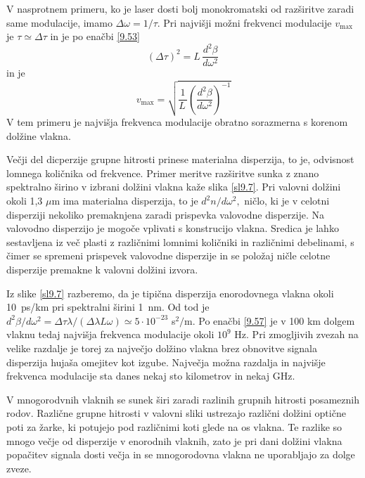 V nasprotnem primeru, ko je laser dosti bolj monokromatski od razširitve
zaradi same modulacije, imamo $\Delta\omega=1/\tau$. Pri najvišji
možni frekvenci modulacije $v_{\max}$ je $\tau\simeq\Delta\tau$
in je po enačbi \ref{9.53} 
\begin{equation}
(\Delta\tau)^{2}=L\,\frac{d^{2}\beta}{d\omega^{2}}\,\label{9.56}
\end{equation}
 in je 
\begin{equation}
v_{\max}=\sqrt{\frac{1}{L\,}\left(\frac{d^{2}\beta}{d\omega^{2}}\right)^{-1}}\label{9.57}
\end{equation}
 V tem primeru je najvišja frekvenca modulacije obratno sorazmerna
s korenom dolžine vlakna.

Večji del dicperzije grupne hitrosti prinese materialna disperzija,
to je, odvisnost lomnega količnika od frekvence. Primer meritve razširitve
sunka z znano spektralno širino v izbrani dolžini vlakna kaže slika
\ref{sl9.7}. Pri valovni dolžini okoli 1,3 $\mu$m ima materialna
disperzija, to je $d^{2}n/d\omega^{2},$ ničlo, ki je v celotni disperziji
nekoliko premaknjena zaradi prispevka valovodne disperzije. Na valovodno
disperzijo je mogoče vplivati s konstrucijo vlakna. Sredica je lahko
sestavljena iz več plasti z različnimi lomnimi količniki in različnimi
debelinami, s čimer se spremeni prispevek valovodne disperzije in
se položaj ničle celotne disperzije premakne k valovni dolžini izvora.

Iz slike \ref{sl9.7} razberemo, da je tipična disperzija enorodovnega
vlakna okoli 10~ps/km pri spektralni širini 1~nm. Od tod je 
$d^{2}\beta/d\omega^{2}=\Delta\tau\lambda/\left(\Delta\lambda L\omega\right)\simeq5\cdot10^{-23}$
s$^{2}/$m. Po enačbi \ref{9.57} je v 100 km dolgem vlaknu tedaj
najvišja frekvenca modulacije okoli $10^{9}$ Hz. Pri zmogljivih zvezah
na velike razdalje je torej za največjo dolžino vlakna brez obnovitve
signala disperzija hujaša omejitev kot izgube. Največja možna razdalja
in najvišje frekvenca modulacije sta danes nekaj sto kilometrov in
nekaj GHz.

V mnogorodvnih vlaknih se sunek širi zaradi razli\textquotedbl{}nih
grupnih hitrosti posameznih rodov. Različne grupne hitrosti v valovni
sliki ustrezajo različni dolžini optične poti za žarke, ki potujejo
pod različnimi koti glede na os vlakna. Te razlike so mnogo večje
od disperzije v enorodnih vlaknih, zato je pri dani dolžini vlakna
popačitev signala dosti večja in se mnogorodovna vlakna ne uporabljajo
za dolge zveze.

